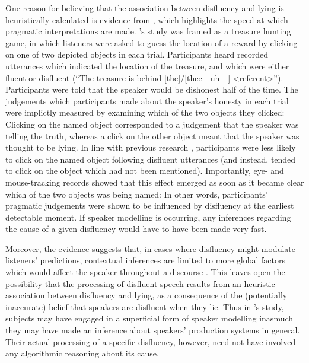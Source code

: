 \documentclass[a4paper,man,natbib]{apa6}
\newcommand*{\spex}[1]{``{#1}''} %
\begin{document}
One reason for believing that the association between disfluency and lying is heuristically calculated is evidence from \citet{Loy2016}, which highlights the speed at which pragmatic interpretations are made.
\citeauthor{Loy2016}'s study was framed as a treasure hunting game, in which listeners were asked to guess the location of a reward by clicking on one of two depicted objects in each trial.
Participants heard recorded utterances which indicated the location of the treasure, and which were either fluent or disfluent (\spex{The treasure is behind [the]/[thee---uh---] \textless referent\textgreater}).
Participants were told that the speaker would be dishonest half of the time. 
The judgements which participants made about the speaker's honesty in each trial were implictly measured by examining which of the two objects they clicked:
Clicking on the named object corresponded to a judgement that the speaker was telling the truth, whereas a click on the other object meant that the speaker was thought to be lying.
In line with previous research \citep{Zuckerman1981},  participants were less likely to click on the named object following disfluent utterances (and instead, tended to click on the object which had not been mentioned).
Importantly, eye- and mouse-tracking records showed that this effect emerged as soon as it became clear which of the two objects was being named:
In other words, participants' pragmatic judgements were shown to be influenced by disfluency at the earliest detectable moment.
If speaker modelling is occurring, any inferences regarding the cause of a given disfluency would have to have been made very fast.


Moreover, the evidence suggests that, in cases where disfluency might modulate listeners' predictions, contextual inferences are limited to more global factors which would affect the speaker throughout a discourse \citep{Arnold2007}.
This leaves open the possibility that the processing of disfluent speech results from an heuristic association between disfluency and lying, as a consequence of the (potentially inaccurate) belief that speakers are disfluent when they lie. 
Thus in \citeauthor{Loy2016}'s study, subjects may have engaged in a superficial form of speaker modelling inasmuch they may have made an inference about speakers' production systems in general.
Their actual processing of a specific disfluency, however, need not have involved any algorithmic reasoning about its cause.
\end{document}
